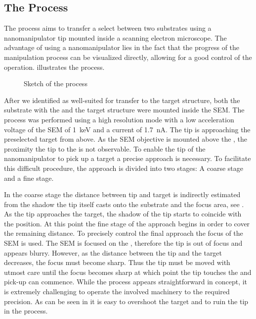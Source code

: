 	\subsection{The \PP Process}

			The \pp process aims to transfer a select \nd between two substrates using a nanomanipulator tip mounted inside a scanning electron microscope. The advantage of using a nanomanipulator lies in the fact that the progress of the manipulation process can be visualized directly, allowing for a good control of the operation.  illustrates the process.

			\begin{figure}[!htb]
				\centering
				\caption{Sketch of the \pp process}
				\label{fig::pp_sketch}
			\end{figure}

	After we identified \nds as well-suited for transfer to the target structure, both the substrate with the \nds and the target structure were mounted inside the SEM.
	The process was performed using a high resolution mode with a low acceleration voltage of the SEM of \SI{1}{\kilo\electronvolt} and a current of \SI{1.7}{\nano\ampere}.
	The tip is approaching the preselected target \nd from above.
	As the SEM objective is mounted above the \np, the proximity the \np tip  to the \nd is not observable.
	To enable the tip of the nanomanipulator to pick up a target \nd a precise approach is necessary. To facilitate this difficult procedure, the approach is divided into two stages: A coarse stage and a fine stage.

	In the coarse stage the distance between tip and target \nd is indirectly estimated from the shadow the tip itself casts onto the substrate and the focus area, see . As the tip approaches the target, the shadow of the tip starts to coincide with the \nd position. At this point the fine stage of the approach begins in order to cover the remaining distance. To precisely control the final approach the focus of the SEM is used. The SEM is focused on the \nd, therefore the tip is out of focus and appears blurry. However, as the distance between the tip and the target decreases, the focus must become sharp. Thus the tip must be moved with utmost care until the focus becomes sharp at which point the tip touches the \nd and pick-up can commence. While the process appears straightforward in concept, it is extremely challenging to operate the involved machinery to the required precision. As can be seen in  it is easy to overshoot the target and to ruin the tip in the process.

